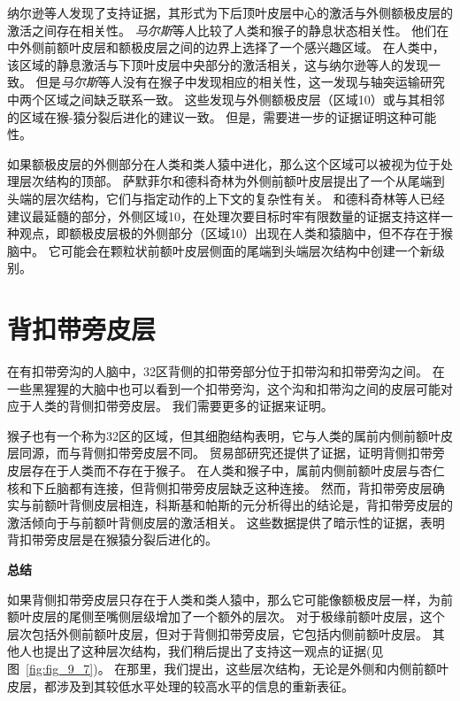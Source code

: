 纳尔逊等人\cite{nelson2010parcellation}发现了支持证据，其形式为下后顶叶皮层中心的激活与外侧额极皮层的激活之间存在相关性。
\textit{马尔斯}等人\cite{mars2011diffusion}比较了人类和猴子的静息状态相关性。
他们在中外侧前额叶皮层和额极皮层之间的边界上选择了一个感兴趣区域。
在人类中，该区域的静息激活与下顶叶皮层中央部分的激活相关，这与纳尔逊等人的发现一致。
但是\textit{马尔斯}等人没有在猴子中发现相应的相关性，这一发现与轴突运输研究中两个区域之间缺乏联系一致。
这些发现与外侧额极皮层（区域10）或与其相邻的区域在猴-猿分裂后进化的建议一致。
但是，需要进一步的证据证明这种可能性。
\par


如果额极皮层的外侧部分在人类和类人猿中进化，那么这个区域可以被视为位于处理层次结构的顶部。
萨默菲尔和德科奇林为外侧前额叶皮层提出了一个从尾端到头端的层次结构，它们与指定动作的上下文的复杂性有关。
和德科奇林等人\cite{koechlin1999role}已经建议最延髓的部分，外侧区域10，在处理次要目标时牢有限数量的证据支持这样一种观点，即额极皮层极的外侧部分（区域10）出现在人类和猿脑中，但不存在于猴脑中。
它可能会在颗粒状前额叶皮层侧面的尾端到头端层次结构中创建一个新级别。



\section{背扣带旁皮层}

在有扣带旁沟的人脑中，32区背侧的扣带旁部分位于扣带沟和扣带旁沟之间\cite{ba2009architecture}。
在一些黑猩猩的大脑中也可以看到一个扣带旁沟，这个沟和扣带沟之间的皮层可能对应于人类的背侧扣带旁皮层。
我们需要更多的证据来证明。
\par


猴子也有一个称为32区\cite{ba2009architecture}的区域，但其细胞结构表明，它与人类的属前内侧前额叶皮层同源，而与背侧扣带旁皮层不同。
贸易部研究还提供了证据，证明背侧扣带旁皮层存在于人类而不存在于猴子。
在人类和猴子中，属前内侧前额叶皮层与杏仁核和下丘脑都有连接，但背侧扣带旁皮层缺乏这种连接\cite{beckmann2009connectivity}。
然而，背扣带旁皮层确实与前额叶背侧皮层相连，科斯基和帕斯\cite{koski2000functional}的元分析得出的结论是，背扣带旁皮层的激活倾向于与前额叶背侧皮层的激活相关。
这些数据提供了暗示性的证据，表明背扣带旁皮层是在猴猿分裂后进化的。



\textbf{总结}
\par

如果背侧扣带旁皮层只存在于人类和类人猿中，那么它可能像额极皮层一样，为前额叶皮层的尾侧至嘴侧层级增加了一个额外的层次。
对于极缘前额叶皮层，这个层次包括外侧前额叶皮层，但对于背侧扣带旁皮层，它包括内侧前额叶皮层。
其他人也提出了这种层次结构\cite{amodio2006meeting,summerfield2009decision}，我们稍后提出了支持这一观点的证据(见图~\ref{fig:fig_9_7})。
在那里，我们提出，这些层次结构，无论是外侧和内侧前额叶皮层，都涉及到其较低水平处理的较高水平的信息的重新表征。
\par


